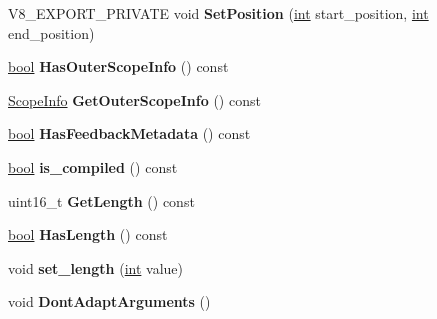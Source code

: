 \begin{DoxyCompactItemize}
V8\+\_\+\+E\+X\+P\+O\+R\+T\+\_\+\+P\+R\+I\+V\+A\+TE void {\bfseries Set\+Position} (\mbox{\hyperlink{classint}{int}} start\+\_\+position, \mbox{\hyperlink{classint}{int}} end\+\_\+position)
\item 
\mbox{\label{classv8_1_1internal_1_1SharedFunctionInfo_a3117ed24998e755497560bf0737e21cc}} 
\mbox{\hyperlink{classbool}{bool}} {\bfseries Has\+Outer\+Scope\+Info} () const
\item 
\mbox{\label{classv8_1_1internal_1_1SharedFunctionInfo_a2ceff899424ad28765cac6cbe7d8dd99}} 
\mbox{\hyperlink{classv8_1_1internal_1_1ScopeInfo}{Scope\+Info}} {\bfseries Get\+Outer\+Scope\+Info} () const
\item 
\mbox{\label{classv8_1_1internal_1_1SharedFunctionInfo_abc9c17639fe583f498513ec81d8ae316}} 
\mbox{\hyperlink{classbool}{bool}} {\bfseries Has\+Feedback\+Metadata} () const
\item 
\mbox{\label{classv8_1_1internal_1_1SharedFunctionInfo_aed1523370433691e42ef5a5bc7c9b3de}} 
\mbox{\hyperlink{classbool}{bool}} {\bfseries is\+\_\+compiled} () const
\item 
\mbox{\label{classv8_1_1internal_1_1SharedFunctionInfo_a9e925d58027fcb2a60313ad2551ebe03}} 
uint16\+\_\+t {\bfseries Get\+Length} () const
\item 
\mbox{\label{classv8_1_1internal_1_1SharedFunctionInfo_ace86792fa1c28ab4a109f189f9a6b6a6}} 
\mbox{\hyperlink{classbool}{bool}} {\bfseries Has\+Length} () const
\item 
\mbox{\label{classv8_1_1internal_1_1SharedFunctionInfo_a6e17b5750109e31cce11bacb15cd8765}} 
void {\bfseries set\+\_\+length} (\mbox{\hyperlink{classint}{int}} value)
\item 
\mbox{\label{classv8_1_1internal_1_1SharedFunctionInfo_abb11e938d3999768b4961fcd6806c015}} 
void {\bfseries Dont\+Adapt\+Arguments} ()
\item 

\end{DoxyCompactItemize}
